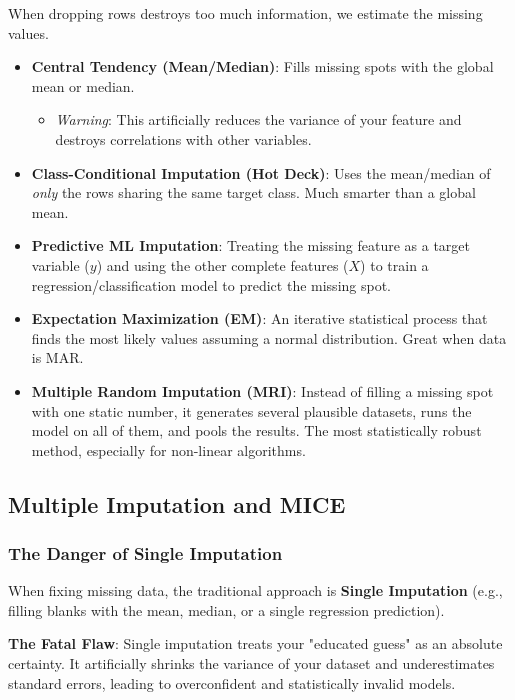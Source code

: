 \documentclass[11pt]{article}
\theoremstyle{smallexample}
\begin{document}
When dropping rows destroys too much information, we estimate the missing values.

\begin{itemize}
    \item \textbf{Central Tendency (Mean/Median)}: Fills missing spots with the global mean or median. 
    \begin{itemize}
        \item \textit{Warning}: This artificially reduces the variance of your feature and destroys correlations with other variables.
    \end{itemize}
    \item \textbf{Class-Conditional Imputation (Hot Deck)}: Uses the mean/median of \textit{only} the rows sharing the same target class. Much smarter than a global mean.
    \item \textbf{Predictive ML Imputation}: Treating the missing feature as a target variable ($y$) and using the other complete features ($X$) to train a regression/classification model to predict the missing spot.
    \item \textbf{Expectation Maximization (EM)}: An iterative statistical process that finds the most likely values assuming a normal distribution. Great when data is MAR.
    \item \textbf{Multiple Random Imputation (MRI)}: Instead of filling a missing spot with one static number, it generates several plausible datasets, runs the model on all of them, and pools the results. The most statistically robust method, especially for non-linear algorithms.
\end{itemize}

\subsection{Multiple Imputation and MICE}

\subsubsection{The Danger of Single Imputation}

When fixing missing data, the traditional approach is \textbf{Single Imputation} (e.g., filling blanks with the mean, median, or a single regression prediction). 

\textbf{The Fatal Flaw}: Single imputation treats your "educated guess" as an absolute certainty. It artificially shrinks the variance of your dataset and underestimates standard errors, leading to overconfident and statistically invalid models.
\end{document}
